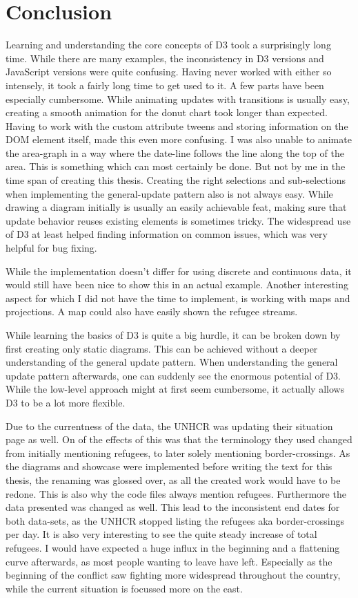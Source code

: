 \chapter{Conclusion}

Learning and understanding the core concepts of D3 took a surprisingly long time. While there are many examples, the inconsistency in D3 versions and JavaScript versions were quite confusing. Having never worked with either so intensely, it took a fairly long time to get used to it. A few parts have been especially cumbersome. While animating updates with transitions is usually easy, creating a smooth animation for the donut chart took longer than expected. Having to work with the custom attribute tweens and storing information on the DOM element itself, made this even more confusing. I was also unable to animate the area-graph in a way where the date-line follows the line along the top of the area. This is something which can most certainly be done. But not by me in the time span of creating this thesis. Creating the right selections and sub-selections when implementing the general-update pattern also is not always easy. While drawing a diagram initially is usually an easily achievable feat, making sure that update behavior reuses existing elements is sometimes tricky. The widespread use of D3 at least helped finding information on common issues, which was very helpful for bug fixing.

While the implementation doesn't differ for using discrete and continuous data, it would still have been nice to show this in an actual example. Another interesting aspect for which I did not have the time to implement, is working with maps and projections. A map could also have easily shown the refugee streams.

While learning the basics of D3 is quite a big hurdle, it can be broken down by first creating only static diagrams. This can be achieved without a deeper understanding of the general update pattern. When understanding the general update pattern afterwards, one can suddenly see the enormous potential of D3. While the low-level approach might at first seem cumbersome, it actually allows D3 to be a lot more flexible. 

Due to the currentness of the data, the UNHCR was updating their situation page as well. On of the effects of this was that the terminology they used changed from initially mentioning refugees, to later solely mentioning border-crossings. As the diagrams and showcase were implemented before writing the text for this thesis, the renaming was glossed over, as all the created work would have to be redone. This is also why the code files always mention refugees. Furthermore the data presented was changed as well. This lead to the inconsistent end dates for both data-sets, as the UNHCR stopped listing the refugees aka border-crossings per day. It is also very interesting to see the quite steady increase of total refugees. I would have expected a huge influx in the beginning and a flattening curve afterwards, as most people wanting to leave have left. Especially as the beginning of the conflict saw fighting more widespread throughout the country, while the current situation is focussed more on the east.
